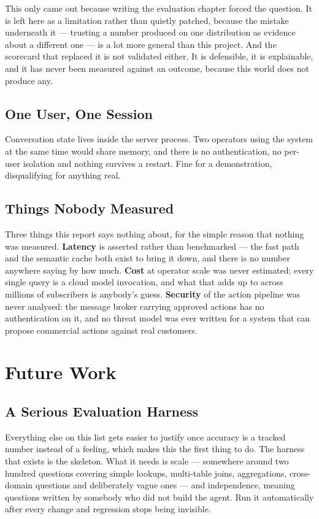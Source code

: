 This only came out because writing the evaluation chapter forced the question.
It is left here as a limitation rather than quietly patched, because the mistake
underneath it --- trusting a number produced on one distribution as evidence
about a different one --- is a lot more general than this project. And the
scorecard that replaced it is not validated either. It is defensible, it is
explainable, and it has never been measured against an outcome, because this
world does not produce any.

\subsection{One User, One Session}

Conversation state lives inside the server process. Two operators using the
system at the same time would share memory, and there is no authentication, no
per-user isolation and nothing survives a restart. Fine for a demonstration,
disqualifying for anything real.

\subsection{Things Nobody Measured}

Three things this report says nothing about, for the simple reason that nothing
was measured. \textbf{Latency} is asserted rather than benchmarked --- the fast
path and the semantic cache both exist to bring it down, and there is no number
anywhere saying by how much. \textbf{Cost} at operator scale was never
estimated; every single query is a cloud model invocation, and what that adds up
to across millions of subscribers is anybody's guess. \textbf{Security} of the
action pipeline was never analysed: the message broker carrying approved actions
has no authentication on it, and no threat model was ever written for a system
that can propose commercial actions against real customers.

\section{Future Work}

\subsection{A Serious Evaluation Harness}

Everything else on this list gets easier to justify once accuracy is a tracked
number instead of a feeling, which makes this the first thing to do. The harness
that exists is the skeleton. What it needs is scale --- somewhere around two
hundred questions covering simple lookups, multi-table joins, aggregations,
cross-domain questions and deliberately vague ones --- and independence, meaning
questions written by somebody who did not build the agent. Run it automatically
after every change and regression stops being invisible.

